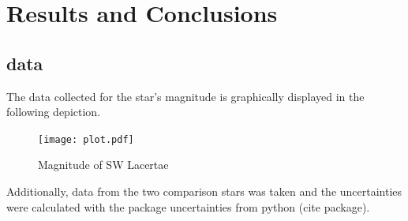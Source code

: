 \section{Results and Conclusions}
\label{sec:make}

\subsection{data}
  \label{sec:America}
  The data collected for the star's magnitude is graphically displayed in the following depiction.
  \begin{figure}[H]
    \centering
    \texttt{[image: plot.pdf]}
    \caption{Magnitude of SW Lacertae}
  \end{figure}
  Additionally, data from the two comparison stars was taken and 
  the uncertainties were calculated with the package uncertainties from python (cite package).

